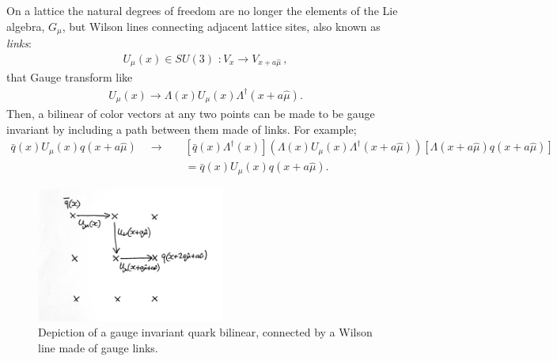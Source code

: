 On a lattice the natural degrees of freedom are no longer the elements of the Lie algebra, $G_{\mu}$, but Wilson lines connecting adjacent lattice sites, also known as {\it{links}}:
\begin{align}
  U_{\mu}(x) \in SU(3)\,\,: V_x \to V_{x+a\hat{\mu}}\,,
\end{align}
that Gauge transform like
\begin{align}
  U_{\mu}(x) \to \Lambda(x) U_{\mu}(x) \Lambda^{\dagger}(x+a\hat{\mu}).
\end{align}
Then, a bilinear of color vectors at any two points can be made to be gauge invariant by including a path between them made of links. For example;
\begin{align}
  \nonumber
  \bar{q}(x)U_{\mu}(x)q(x+a\hat{\mu}) \quad \to\quad &[\bar{q}(x)\Lambda^{\dagger}(x)](\Lambda(x) U_{\mu}(x) \Lambda^{\dagger}(x+a\hat{\mu})) [\Lambda(x+a\hat{\mu})q(x+a\hat{\mu})]
  \\
  &= \bar{q}(x)U_{\mu}(x)q(x+a\hat{\mu}).
\end{align}

\begin{figure}[htb!]
  \begin{center}
    \hspace{+20pt}
    \vspace{-10pt}
    \includegraphics[width=0.55\textwidth]{images/wilson_line.jpg}
    \caption{Depiction of a gauge invariant quark bilinear, connected by a Wilson line made of gauge links.}
  \end{center}
  \vspace{-10pt}
\end{figure}


